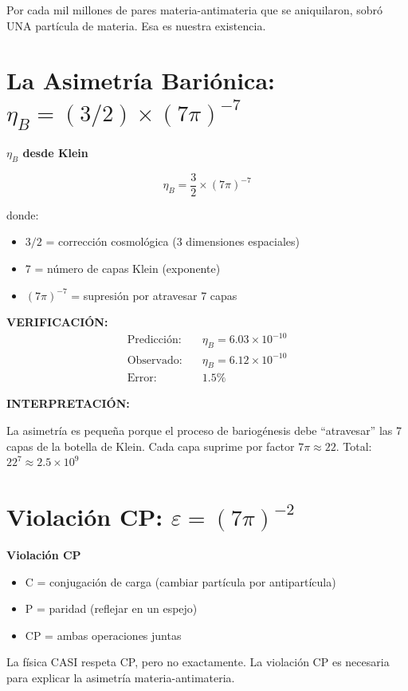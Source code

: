 Por cada mil millones de pares materia-antimateria que se aniquilaron,
sobró UNA partícula de materia. Esa es nuestra existencia.


\section{La Asimetría Bariónica: $\eta_B = (3/2) \times (7\pi)^{-7}$}

\begin{nivelmatematico}
\textbf{$\eta_B$ desde Klein}

\begin{equation}
\boxed{\eta_B = \frac{3}{2} \times (7\pi)^{-7}}
\end{equation}

donde:
\begin{itemize}
    \item $3/2$ = corrección cosmológica (3 dimensiones espaciales)
    \item $7$ = número de capas Klein (exponente)
    \item $(7\pi)^{-7}$ = supresión por atravesar 7 capas
\end{itemize}

\textbf{VERIFICACIÓN:}
\begin{align}
\text{Predicción:} & \quad \eta_B = 6.03 \times 10^{-10}\\
\text{Observado:} & \quad \eta_B = 6.12 \times 10^{-10}\\
\text{Error:} & \quad 1.5\%
\end{align}

\textbf{INTERPRETACIÓN:}

La asimetría es pequeña porque el proceso de bariogénesis
debe ``atravesar'' las 7 capas de la botella de Klein.
Cada capa suprime por factor $7\pi \approx 22$.
Total: $22^7 \approx 2.5 \times 10^9$
\end{nivelmatematico}


\section{Violación CP: $\varepsilon = (7\pi)^{-2}$}

\begin{nivelconceptual}
\textbf{Violación CP}

\begin{itemize}
    \item C = conjugación de carga (cambiar partícula por antipartícula)
    \item P = paridad (reflejar en un espejo)
    \item CP = ambas operaciones juntas
\end{itemize}

La física CASI respeta CP, pero no exactamente.
La violación CP es necesaria para explicar la asimetría materia-antimateria.
\end{nivelconceptual}

